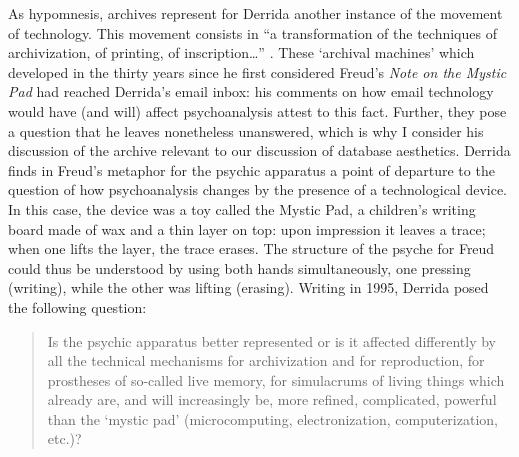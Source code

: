 As hypomnesis, archives represent for Derrida another instance of the movement of technology. This movement consists in ``a transformation of the techniques of archivization, of printing, of inscription\dots'' \parencite[16]{Der95:Arc}. These `archival machines' which developed in the thirty years since he first considered Freud's \textit{Note on the Mystic Pad} had reached Derrida's email inbox: his comments on how email technology would have (and will) affect psychoanalysis attest to this fact. Further, they pose a question that he leaves nonetheless unanswered, which is why I consider his discussion of the archive relevant to our discussion of database aesthetics. Derrida finds in Freud's metaphor for the psychic apparatus a point of departure to the question of how psychoanalysis changes by the presence of a technological device. In this case, the device was a toy called the Mystic Pad, a children's writing board made of wax and a thin layer on top: upon impression it leaves a trace; when one lifts the layer, the trace erases. The structure of the psyche for Freud could thus be understood by using both hands simultaneously, one pressing (writing), while the other was lifting (erasing). Writing in 1995, Derrida posed the following question:

\begin{quote}
	Is the psychic apparatus better represented or is it affected differently by all the technical mechanisms for archivization and for reproduction, for prostheses of so-called live memory, for simulacrums of living things which already are, and will increasingly be, more refined, complicated, powerful than the `mystic pad' (microcomputing, electronization, computerization, etc.)? \parencite[16]{Der95:Arc} 
\end{quote}


